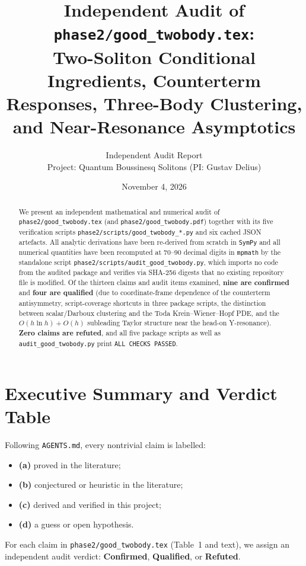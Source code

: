 \documentclass[11pt,a4paper]{article}
\title{Independent Audit of \texttt{phase2/good\_twobody.tex}:\\
Two-Soliton Conditional Ingredients, Counterterm Responses, Three-Body Clustering, and Near-Resonance Asymptotics}
\author{Independent Audit Report \\ Project: Quantum Boussinesq Solitons (PI: Gustav Delius)}
\date{November 4, 2026}
\begin{document}
\maketitle

\begin{abstract}
We present an independent mathematical and numerical audit of \texttt{phase2/good\_twobody.tex} (and \texttt{phase2/good\_twobody.pdf}) together with its five verification scripts \texttt{phase2/scripts/good\_twobody\_*.py} and six cached JSON artefacts. All analytic derivations have been re-derived from scratch in \texttt{SymPy} and all numerical quantities have been recomputed at 70--90 decimal digits in \texttt{mpmath} by the standalone script \texttt{phase2/scripts/audit\_good\_twobody.py}, which imports no code from the audited package and verifies via SHA-256 digests that no existing repository file is modified. Of the thirteen claims and audit items examined, \textbf{nine are confirmed} and \textbf{four are qualified} (due to coordinate-frame dependence of the counterterm antisymmetry, script-coverage shortcuts in three package scripts, the distinction between scalar/Darboux clustering and the Toda Krein--Wiener--Hopf PDE, and the $O(h\ln h)+O(h)$ subleading Taylor structure near the head-on Y-resonance). \textbf{Zero claims are refuted}, and all five package scripts as well as \texttt{audit\_good\_twobody.py} print \texttt{ALL CHECKS PASSED}.
\end{abstract}

\tableofcontents

\section{Executive Summary and Verdict Table}

Following \texttt{AGENTS.md}, every nontrivial claim is labelled:
\begin{itemize}
\item \textbf{(a)} proved in the literature;
\item \textbf{(b)} conjectured or heuristic in the literature;
\item \textbf{(c)} derived and verified in this project;
\item \textbf{(d)} a guess or open hypothesis.
\end{itemize}
For each claim in \texttt{phase2/good\_twobody.tex} (Table~1 and text), we assign an independent audit verdict: \textbf{Confirmed}, \textbf{Qualified}, or \textbf{Refuted}.
\end{document}
